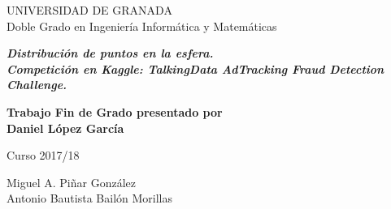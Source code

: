 
\quad

\thispagestyle{empty}


\newpage 



\thispagestyle{empty}


\begin{center}

{\Large UNIVERSIDAD DE GRANADA}\\[10mm]
{\Large\sffamily Doble Grado en Ingeniería Informática y Matemáticas}\\[3mm]


\vspace{3cm}


\begin{Large}
{\slshape\bfseries  Distribución de puntos en la esfera.\\Competición en Kaggle: TalkingData AdTracking Fraud Detection Challenge.\\[6mm]
}
\end{Large}

\vspace{3cm}

\vfill

\begin{large}
{\bf Trabajo Fin de Grado presentado por \\[3mm]
Daniel López García}
\end{large}


\vspace{2cm}

\begin{Large}
Curso 2017/18
\end{Large}
\end{center}

\vfill


\begin{large}
	{Miguel A. Piñar González\\Antonio Bautista Bailón Morillas\\[3mm]}
\end{large}

%


